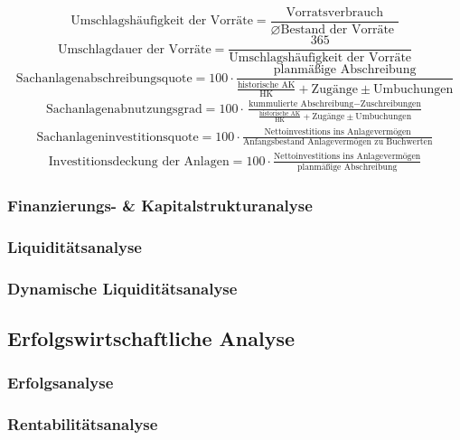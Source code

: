 \documentclass[11pt]{scrartcl}
\begin{document}
\begin{equation}
    \text{Umschlagshäufigkeit der Vorräte} = \frac{\text{Vorratsverbrauch}}{\varnothing\text{Bestand der Vorräte }}
\end{equation}
\begin{equation}
    \text{Umschlagdauer der Vorräte} = \frac{365}{\text{Umschlagshäufigkeit der Vorräte}}
\end{equation}
\begin{equation}
    \text{Sachanlagenabschreibungsquote} = 100\cdot\frac{\text{planmäßige Abschreibung}}{\frac{\text{historische AK}}{\text{HK}} + \text{Zugänge} \pm \text{Umbuchungen}}
\end{equation}
\begin{multline}
    \text{Sachanlagenabnutzungsgrad} = 100\cdot\frac{\text{kummulierte Abschreibung}-\text{Zuschreibungen}}{\frac{\text{historische AK}}{\text{HK}} + \text{Zugänge} \pm \text{Umbuchungen}}
\end{multline}
\begin{multline}
    \text{Sachanlageninvestitionsquote} = 100\cdot\frac{\text{Nettoinvestitions ins Anlagevermögen}}{\text{Anfangsbestand Anlagevermögen zu Buchwerten}}
\end{multline}
\begin{multline}
    \text{Investitionsdeckung der Anlagen} = 100\cdot\frac{\text{Nettoinvestitions ins Anlagevermögen}}{\text{planmäßige Abschreibung}}
\end{multline}
\subsubsection[]{Finanzierungs- \& Kapitalstrukturanalyse}
\subsubsection[]{Liquiditätsanalyse}
\subsubsection[]{Dynamische Liquiditätsanalyse}
\subsection[]{Erfolgswirtschaftliche Analyse}
\subsubsection[]{Erfolgsanalyse}
\subsubsection[]{Rentabilitätsanalyse}
\end{document}
